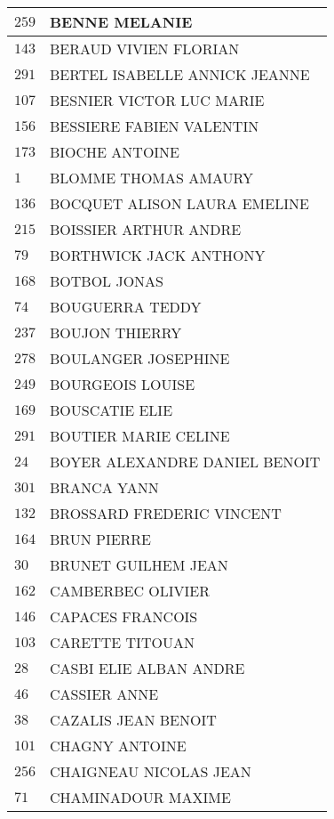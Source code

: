 \begin{xltabular}{\linewidth}{|l|X|}
    $259$ & BENNE MELANIE \\
    \hline
    $143$ & BERAUD VIVIEN FLORIAN \\
    \hline
    $291$ & BERTEL ISABELLE ANNICK JEANNE \\
    \hline
    $107$ & BESNIER VICTOR LUC MARIE \\
    \hline
    $156$ & BESSIERE FABIEN VALENTIN \\
    \hline
    $173$ & BIOCHE ANTOINE \\
    \hline
    $1$ & BLOMME THOMAS AMAURY \\
    \hline
    $136$ & BOCQUET ALISON LAURA EMELINE \\
    \hline
    $215$ & BOISSIER ARTHUR ANDRE \\
    \hline
    $79$ & BORTHWICK JACK ANTHONY \\
    \hline
    $168$ & BOTBOL JONAS \\
    \hline
    $74$ & BOUGUERRA TEDDY \\
    \hline
    $237$ & BOUJON THIERRY \\
    \hline
    $278$ & BOULANGER JOSEPHINE \\
    \hline
    $249$ & BOURGEOIS LOUISE \\
    \hline
    $169$ & BOUSCATIE ELIE \\
    \hline
    $291$ & BOUTIER MARIE CELINE \\
    \hline
    $24$ & BOYER ALEXANDRE DANIEL BENOIT \\
    \hline
    $301$ & BRANCA YANN \\
    \hline
    $132$ & BROSSARD FREDERIC VINCENT \\
    \hline
    $164$ & BRUN PIERRE \\
    \hline
    $30$ & BRUNET GUILHEM JEAN \\
    \hline
    $162$ & CAMBERBEC OLIVIER \\
    \hline
    $146$ & CAPACES FRANCOIS \\
    \hline
    $103$ & CARETTE TITOUAN \\
    \hline
    $28$ & CASBI ELIE ALBAN ANDRE \\
    \hline
    $46$ & CASSIER ANNE \\
    \hline
    $38$ & CAZALIS JEAN BENOIT \\
    \hline
    $101$ & CHAGNY ANTOINE \\
    \hline
    $256$ & CHAIGNEAU NICOLAS JEAN \\
    \hline
    $71$ & CHAMINADOUR MAXIME \\

\end{xltabular}
